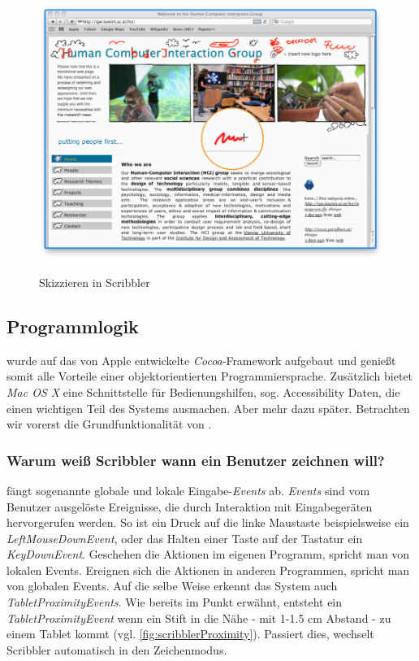 \begin{figure}
        {\includegraphics[width=1\linewidth]{gfx/scribblerSketching}}
		\caption[Skizzieren in Scribbler]{Skizzieren in Scribbler}\label{fig:scribblerSketching}
\end{figure}

\subsection{Programmlogik} \label{sec:programmLogik}
\scribbler wurde auf das von Apple entwickelte \emph{Cocoa}-Framework aufgebaut und genießt somit alle Vorteile einer objektorientierten Programmiersprache. Zusätzlich bietet \emph{Mac OS X} eine Schnittstelle für Bedienungshilfen, sog. Accessibility Daten, die einen wichtigen Teil des Systems ausmachen. Aber mehr dazu später. Betrachten wir vorerst die Grundfunktionalität von \scribbler.

\subsubsection* {Warum weiß Scribbler wann ein Benutzer zeichnen will?}
\scribbler fängt sogenannte globale und lokale Eingabe-\emph{Events} ab. \emph{Events} sind vom Benutzer ausgelöste Ereignisse, die durch Interaktion mit Eingabegeräten hervorgerufen werden. So ist ein Druck auf die linke Maustaste beispielsweise ein \emph{LeftMouseDownEvent}, oder das Halten einer Taste auf der Tastatur ein \emph{KeyDownEvent}. Geschehen die Aktionen im eigenen Programm, spricht man von lokalen Events. Ereignen sich die Aktionen in anderen Programmen, spricht man von globalen Events. Auf die selbe Weise erkennt das System auch \emph{TabletProximityEvents}. Wie bereits im Punkt  erwähnt, entsteht ein \emph{TabletProximityEvent} wenn ein Stift in die Nähe - mit 1-1.5 cm Abstand - zu einem Tablet kommt (vgl. \autoref{fig:scribblerProximity}). Passiert dies, wechselt Scribbler automatisch in den Zeichenmodus. 

